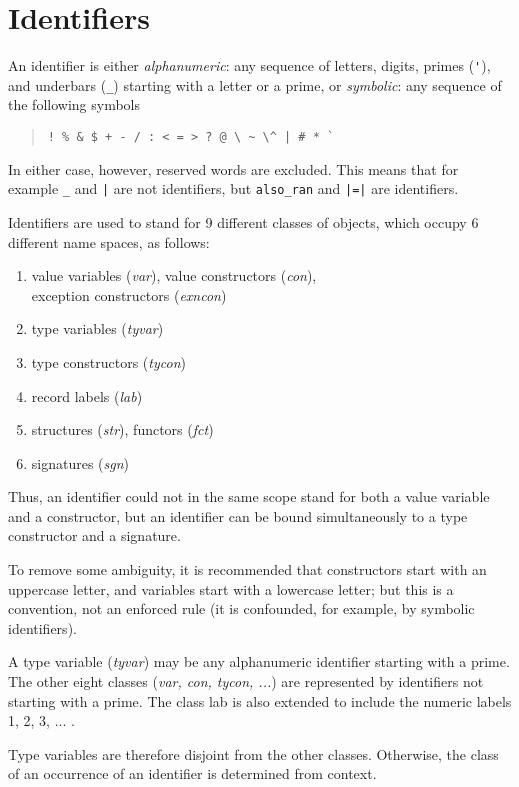 \section{Identifiers}

An identifier is either {\em alphanumeric}: any sequence of letters,
digits, primes (\verb"'"), and underbars (\verb"_") starting with a letter or a
prime, or {\em symbolic}: any sequence of the following symbols
\begin{quote}
\verb"! % & $ + - / : < = > ? @ \ ~ \^ | # * `"
\end{quote}
In either case, however, reserved words are excluded.  This means
that for example \verb"_" and \verb"|" are not identifiers, but
\verb"also_ran" and \verb"|=|" are identifiers.

Identifiers are used to stand for 9 different classes of objects,
which occupy 6 different name spaces, as follows:
\begin{enumerate}
\item value variables ({\it var}), value constructors ({\it con}), \\
exception constructors ({\it exncon})
\item type variables ({\it tyvar})
\item type constructors ({\it tycon})
\item record labels ({\it lab})
\item structures ({\it str}), functors ({\it fct})
\item signatures ({\it sgn})
\end{enumerate}
Thus, an identifier could not in the same scope stand for both a
value variable and a constructor, but an identifier can
be bound simultaneously to a type constructor and a signature.

To remove some ambiguity, it is recommended that constructors start
with an uppercase letter, and variables start with a lowercase
letter; but this is a convention, not an enforced rule  (it is
confounded, for example, by symbolic identifiers).

A type variable ({\it tyvar}) may be any alphanumeric identifier starting
with a prime.  The other eight classes ({\it var, con, tycon, ...})
are represented by identifiers not starting with a prime.  The class
lab is also extended to include the numeric labels 1, 2, 3, ... .

Type variables are therefore disjoint from the other classes.
Otherwise, the class of an occurrence of an identifier is determined
from context.


